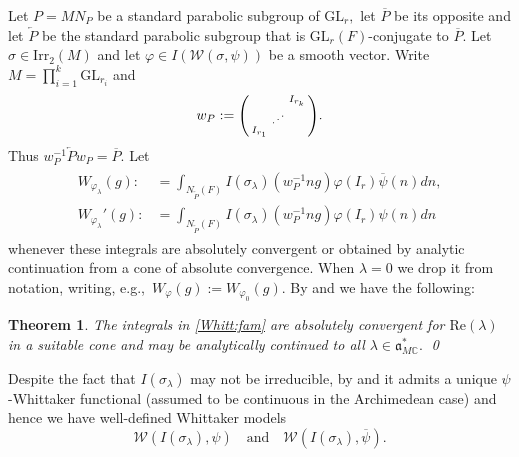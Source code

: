 \documentclass[12pt]{amsart}
\newtheorem{thm}{Theorem}[section]
\theoremstyle{remark}
\numberwithin{equation}{section}
\newcommand{\GL}{\mathrm{GL}}
\newcommand{\CC}{\mathbb{C}}
\theoremstyle{definition}
\newenvironment{psmatrix}
  {\left(\begin{smallmatrix}}
  {\end{smallmatrix}\right)}
\renewcommand{\bar}{\overline}
\numberwithin{equation}{subsection}
\begin{document}
Let $P=MN_P$ be a standard parabolic subgroup of $\GL_r,$ let $\bar{P}$ be its opposite and let $\overleftarrow{P}$ be the standard parabolic subgroup that is $\GL_r(F)$-conjugate to $\bar{P}.$
Let $\sigma \in \mathrm{Irr}_2(M)$ and let $\varphi \in I(\mathcal{W}(\sigma,\psi))$ be a smooth vector.  Write $M=\prod_{i=1}^k\GL_{r_i}$ and
\begin{align} \label{wP}
w_P:=\begin{psmatrix} & & I_{r_k}\\ & \textrm{\reflectbox{$\ddots$}} & \\ I_{r_1} & & \end{psmatrix}.
\end{align}
Thus $w_P^{-1}\overleftarrow{P}w_P=\overline{P}.$ Let 
\begin{align} \begin{split} \label{Whitt:fam}
W_{\varphi_{\lambda}}(g):&=\int_{N_{\overleftarrow{P}}(F)}I(\sigma_\lambda)\left(w_P^{-1}ng\right)\varphi(I_r) \overline{\psi}(n)dn,\\
W_{\varphi_{\lambda}}'(g):&=\int_{N_{\overleftarrow{P}}(F)}I(\sigma_\lambda)\left(w_P^{-1}ng\right)\varphi(I_r) \psi(n)dn \end{split}
\end{align}
whenever these integrals are absolutely convergent or obtained by analytic continuation from a cone of absolute convergence.  When $\lambda=0$ we drop it from notation, writing, e.g.,~$W_{\varphi}(g):=W_{\varphi_0}(g).$
By \cite[Theorem 15.4.1]{Wallach} and
 \cite[Proposition 3.1]{Shahidi:On:certain} we have the following:


\begin{thm} \label{thm:Whitt:analyfam}
The integrals in \eqref{Whitt:fam} are absolutely convergent for $\mathrm{Re}(\lambda)$ in a suitable cone and may be analytically continued to all $\lambda \in \mathfrak{a}_{M\CC}^\ast.$  \qed
\end{thm}

  Despite the fact that $I(\sigma_\lambda)$ may not be irreducible, by \cite[\S 2]{JacquetPerfectRS} and \cite[Th\'eor\`emes 2 and 4]{Rodier:Whitt} it admits a unique $\psi$-Whittaker functional (assumed to be continuous in the Archimedean case) and hence we have well-defined Whittaker models
$$
\mathcal{W}(I(\sigma_\lambda),\psi) \quad \textrm{and}\quad \mathcal{W}(I(\sigma_\lambda),\overline{\psi}).
$$
\end{document}
